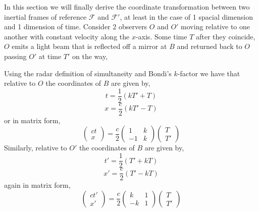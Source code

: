 \documentclass[a4paper,12pt,draft]{report}
\begin{document}
In this section we will finally derive the coordinate transformation between two inertial frames of reference $\mathcal{F}$ and $\mathcal{F'}$, at least in the case of 1 spacial dimension and 1 dimension of time. Consider 2 observers $O$ and $O'$ moving relative to one another with constant velocity along the $x$-axis. Some time $T$ after they coincide, $O$ emits a light beam that is reflected off a mirror at $B$ and returned back to $O$ passing $O'$ at time $T'$ on the way,
\begin{center}
\end{center}
Using the radar definition of simultaneity and Bondi's $k$-factor we have that relative to $O$ the coordinates of $B$ are given by,
$$
t = \frac{1}{2}\left(kT' + T\right)
$$
$$
x = \frac{c}{2}\left(kT' - T\right)
$$
or in matrix form,
\begin{equation}
\begin{pmatrix}ct\\x\end{pmatrix} = \frac{c}{2}
\begin{pmatrix}
1 & k\\
-1 & k
\end{pmatrix}
\begin{pmatrix}T\\T'\end{pmatrix} \label{BRtO}
\end{equation}
Similarly, relative to $O'$ the coordinates of $B$ are given by,
$$
t' = \frac{1}{2}\left(T' + kT\right)
$$
$$
x' = \frac{c}{2}\left(T' - kT\right)
$$
again in matrix form,
$$
\begin{pmatrix}ct'\\x'\end{pmatrix} = \frac{c}{2}
\begin{pmatrix}
k & 1\\
-k & 1
\end{pmatrix}
\begin{pmatrix}T\\T'\end{pmatrix}
$$
\end{document}
